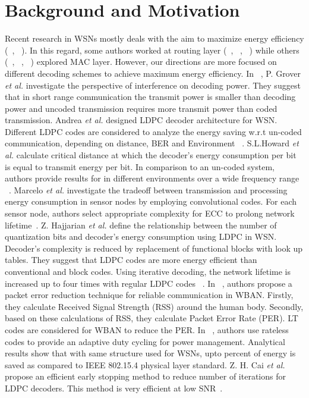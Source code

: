 \documentclass[3p,times,procedia]{elsarticle}
\begin{document}
\section{Background and Motivation}
\label{sec:format}
Recent research in WSNs mostly deals with the aim to maximize energy efficiency (~\cite{1}, ~\cite{2}). In this regard, some authors worked at routing layer (~\cite{3}, ~\cite{4}, ~\cite{5}) while others (~\cite{6}, ~\cite{7}, ~\cite{8}) explored MAC layer. However, our directions are more focused on different decoding schemes to achieve maximum energy efficiency. In ~\cite{9}, P. Grover \textit{et al.} investigate the perspective of interference on decoding power. They suggest that in short range communication the transmit power is smaller than decoding power and uncoded transmission requires more transmit power than coded transmission. Andrea \textit{et al.} designed LDPC decoder architecture for WSN. Different LDPC codes are considered to analyze the energy saving w.r.t un-coded communication, depending on distance, BER and Environment ~\cite{10}.
S.L.Howard \textit{et al.} calculate critical distance  at which the decoder's energy consumption per bit is equal to transmit energy per bit. In comparison to an un-coded system, authors provide results for  in different environments over a wide frequency range ~\cite{11}. Marcelo \textit{et al.} investigate the tradeoff between transmission and processing energy consumption in sensor nodes by employing convolutional codes. For each sensor node, authors select appropriate complexity for ECC to prolong network lifetime~\cite{12}. Z. Hajjarian \textit{et al.} define the relationship between the number of quantization bits and decoder's energy consumption using LDPC in WSN. Decoder's complexity is reduced by replacement of functional blocks with look up tables. They suggest that LDPC codes are more energy efficient than conventional and block codes. Using iterative decoding, the network lifetime is increased up to four times with regular LDPC codes ~\cite{13}. In ~\cite{14}, authors propose a packet error reduction technique for reliable communication in WBAN. Firstly, they calculate Received Signal Strength (RSS) around the human body. Secondly, based on these calculations of RSS, they calculate Packet Error Rate (PER). LT codes are considered for WBAN to reduce the PER. In ~\cite{15}, authors use rateless codes to provide an adaptive duty cycling for power management. Analytical results show that with same structure used for WSNs, upto  percent of energy is saved as compared to IEEE 802.15.4 physical layer standard. Z. H. Cai \textit{et al.} propose an efficient early stopping method to reduce number of iterations for LDPC decoders. This method is very efficient at low SNR~\cite{16}.
\end{document}
